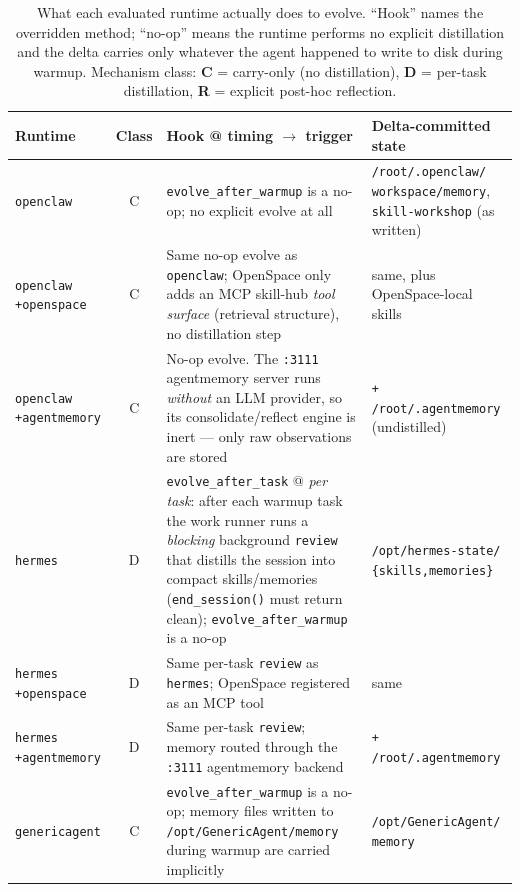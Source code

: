 \documentclass{article}
\begin{document}
\begin{table}[h]
\centering
\footnotesize
\caption{What each evaluated runtime actually does to evolve. ``Hook'' names the overridden method; ``no-op'' means the runtime performs no explicit distillation and the delta carries only whatever the agent happened to write to disk during warmup. Mechanism class: \textbf{C} = carry-only (no distillation), \textbf{D} = per-task distillation, \textbf{R} = explicit post-hoc reflection.}
\label{tab:evo-mech}
\begin{tabular}{P{0.16\textwidth}cP{0.44\textwidth}P{0.22\textwidth}}
\toprule
Runtime & Class & Hook @ timing $\rightarrow$ trigger & Delta-committed state \\
\midrule
\texttt{openclaw} & C & \texttt{evolve\_after\_warmup} is a no-op; no explicit evolve at all & \texttt{/root/.openclaw/} \texttt{workspace/memory}, \texttt{skill-workshop} (as written) \\
\addlinespace
\texttt{openclaw} \texttt{+openspace} & C & Same no-op evolve as \texttt{openclaw}; OpenSpace only adds an MCP skill-hub \emph{tool surface} (retrieval structure), no distillation step & same, plus OpenSpace-local skills \\
\addlinespace
\texttt{openclaw} \texttt{+agentmemory} & C & No-op evolve. The \texttt{:3111} agentmemory server runs \emph{without} an LLM provider, so its consolidate/reflect engine is inert --- only raw observations are stored & \texttt{+ /root/.agentmemory} (undistilled) \\
\midrule
\texttt{hermes} & D & \texttt{evolve\_after\_task} @ \emph{per task}: after each warmup task the work runner runs a \emph{blocking} background \texttt{review} that distills the session into compact skills/memories (\texttt{end\_session()} must return clean); \texttt{evolve\_after\_warmup} is a no-op & \texttt{/opt/hermes-state/} \texttt{\{skills,memories\}} \\
\addlinespace
\texttt{hermes} \texttt{+openspace} & D & Same per-task \texttt{review} as \texttt{hermes}; OpenSpace registered as an MCP tool & same \\
\addlinespace
\texttt{hermes} \texttt{+agentmemory} & D & Same per-task \texttt{review}; memory routed through the \texttt{:3111} agentmemory backend & \texttt{+ /root/.agentmemory} \\
\midrule
\texttt{genericagent} & C & \texttt{evolve\_after\_warmup} is a no-op; memory files written to \texttt{/opt/GenericAgent/memory} during warmup are carried implicitly & \texttt{/opt/GenericAgent/} \texttt{memory} \\

\end{tabular}
\end{table}
\end{document}
